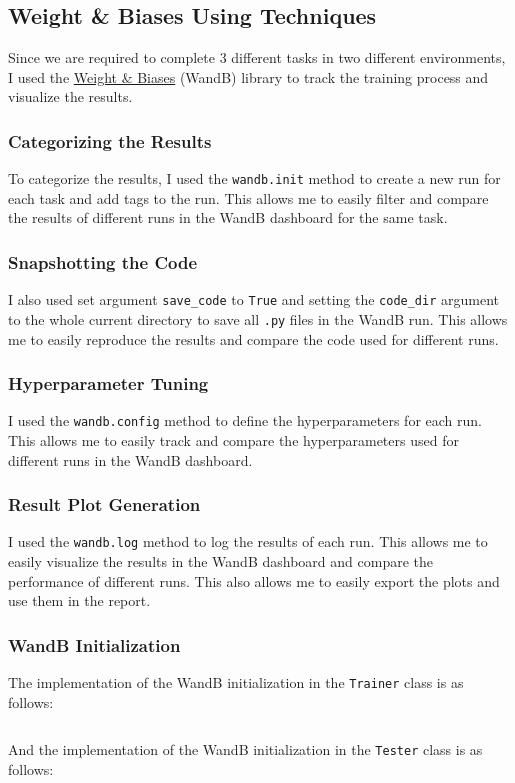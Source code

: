 \inputminted[firstline=20, lastline=82,highlightlines={43,53-60,72-75}]{python}{../dqn.py}

\subsection{Weight \& Biases Using Techniques}

Since we are required to complete 3 different tasks in two different environments, I used the \href{https://wandb.ai/site}{Weight \& Biases} (WandB) library to track the training process and visualize the results.

\subsubsection{Categorizing the Results}
To categorize the results, I used the \texttt{wandb.init} method to create a new run for each task and add tags to the run.
This allows me to easily filter and compare the results of different runs in the WandB dashboard for the same task.

\subsubsection{Snapshotting the Code}
I also used set argument \texttt{save\_code} to \texttt{True} and setting the \texttt{code\_dir} argument to the whole current directory to save all \texttt{.py} files in the WandB run.
This allows me to easily reproduce the results and compare the code used for different runs.

\subsubsection{Hyperparameter Tuning}
I used the \texttt{wandb.config} method to define the hyperparameters for each run.
This allows me to easily track and compare the hyperparameters used for different runs in the WandB dashboard.

\subsubsection{Result Plot Generation}
I used the \texttt{wandb.log} method to log the results of each run.
This allows me to easily visualize the results in the WandB dashboard and compare the performance of different runs.
This also allows me to easily export the plots and use them in the report.

\subsubsection{WandB Initialization}
The implementation of the WandB initialization in the \texttt{Trainer} class is as follows:
\inputminted[firstline=241,lastline=248,highlightlines={244-246,248}]{python}{../trainer.py}
And the implementation of the WandB initialization in the \texttt{Tester} class is as follows:
\inputminted[firstline=152,lastline=158,highlightlines={154-156,158}]{python}{../tester.py}
